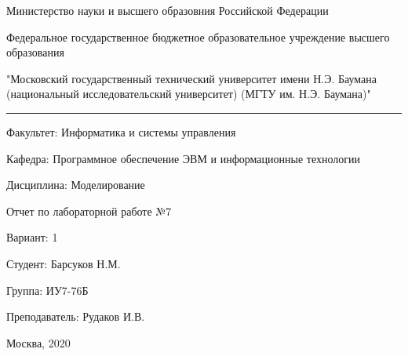 \begin{center}
	Министерство науки и высшего образовния Российской Федерации
		
	Федеральное государственное бюджетное образовательное учреждение 
	высшего образования
	
	"Московский государственный технический университет имени Н.Э. Баумана (национальный исследовательский университет) (МГТУ им. Н.Э. Баумана)"
\end{center}

\hrule

\begin{flushleft}
	Факультет: Информатика и системы управления
	
	Кафедра: Программное обеспечение ЭВМ и информационные технологии
	
	Дисциплина: Моделирование
\end{flushleft}

\vspace{2cm}

\begin{center}
	Отчет по лабораторной работе №7
	
	Вариант: 1
\end{center}

\vspace{2cm}

\begin{flushleft}
	Студент: Барсуков Н.М.

	Группа: ИУ7-76Б
	
	Преподаватель: Рудаков И.В.
\end{flushleft}

\vspace*{\fill}
\begin{center}
	Москва, 2020
\end{center}